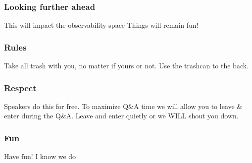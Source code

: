 \documentclass[aspectratio=169]{beamer}
\begin{document}
\begin{frame}
	\frametitle{Looking further ahead}
	\begin{center}
		\vfill
		This will impact the observability space
		\vfill
		Things will remain fun!
		\vfill
	\end{center}
\end{frame}

\begin{frame}
	\frametitle{Rules}
	\begin{center}
		\vfill
		Take all trash with you, no matter if yours or not.
		\vfill
		Use the trashcan to the back.
		\vfill
	\end{center}
\end{frame}

\begin{frame}
	\frametitle{Respect}
	\begin{center}
		\vfill
		Speakers do this for free.
		\vfill
		To maximize Q\&A time we will allow you to leave \& enter during the Q\&A.
		\vfill
		Leave and enter quietly or we WILL shout you down.
		\vfill
	\end{center}
\end{frame}

\begin{frame}
	\frametitle{Fun}
	\begin{center}
		\vfill
		Have fun!
		\vfill
		I know we do
		\vfill
	\end{center}
\end{frame}


\end{document}
